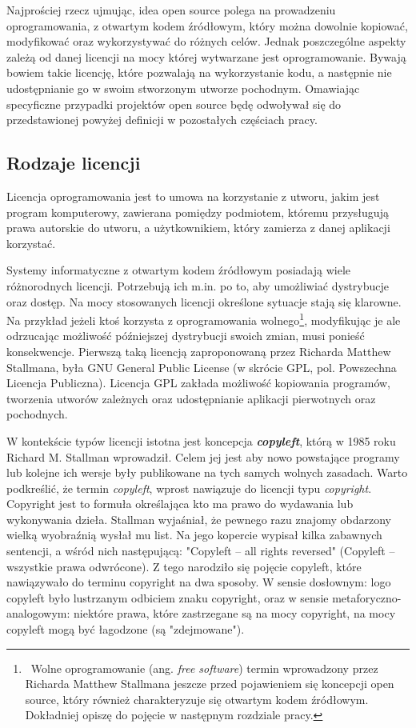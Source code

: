 \documentclass{article}
\begin{document}
Najprościej rzecz ujmując, idea open source polega na prowadzeniu oprogramowania, z otwartym kodem źródłowym, który można dowolnie kopiować, modyfikować oraz wykorzystywać do różnych celów. Jednak poszczególne aspekty zależą od danej licencji na mocy której wytwarzane jest oprogramowanie. Bywają bowiem takie licencję, które pozwalają na wykorzystanie kodu, a następnie nie udostępnianie go w swoim stworzonym utworze pochodnym. Omawiając specyficzne przypadki projektów open source będę odwoływał się do przedstawionej powyżej definicji w pozostałych częściach pracy.

\subsection{Rodzaje licencji}

\hspace{4mm} Licencja oprogramowania jest to umowa na korzystanie z utworu, jakim jest program komputerowy, zawierana pomiędzy podmiotem, któremu przysługują prawa autorskie do utworu, a użytkownikiem, który zamierza z danej aplikacji korzystać\cite{wikipedia1}.

Systemy informatyczne z otwartym kodem źródłowym posiadają wiele różnorodnych licencji. Potrzebują ich m.in. po to, aby umożliwiać dystrybucje oraz dostęp. Na mocy stosowanych licencji określone sytuacje stają się klarowne. Na przykład jeżeli ktoś korzysta z oprogramowania wolnego\footnote{\, Wolne oprogramowanie (ang. \emph{free software}) termin wprowadzony przez Richarda Matthew Stallmana jeszcze przed pojawieniem się koncepcji open source, który również charakteryzuje się otwartym kodem źródłowym. Dokładniej opiszę do pojęcie w następnym rozdziale pracy.}, modyfikując je ale odrzucając możliwość późniejszej dystrybucji swoich zmian, musi ponieść konsekwencje. Pierwszą taką licencją zaproponowaną przez Richarda Matthew Stallmana, była GNU General Public License (w skrócie GPL, pol. Powszechna Licencja Publiczna)\cite{Kotula}. Licencja GPL zakłada możliwość kopiowania programów, tworzenia utworów zależnych oraz udostępnianie aplikacji pierwotnych oraz pochodnych\cite{wikipedia2}.

W kontekście typów licencji istotna jest koncepcja \textbf{\emph{copyleft}}, którą w 1985 roku Richard M. Stallman wprowadził. Celem jej jest aby nowo powstające programy lub kolejne ich wersje były publikowane na tych samych wolnych zasadach. Warto podkreślić, że termin \emph{copyleft}, wprost nawiązuje do licencji typu \emph{copyright}. Copyright jest to formuła określająca kto ma prawo do wydawania lub wykonywania dzieła\cite{sjp}. Stallman wyjaśniał, że pewnego razu znajomy obdarzony wielką wyobraźnią wysłał mu list. Na jego kopercie wypisał kilka zabawnych sentencji, a wśród nich następującą: "Copyleft  – all rights reversed" (Copyleft  – wszystkie prawa odwrócone). Z tego narodziło się pojęcie copyleft, które nawiązywało do terminu copyright na dwa sposoby. W sensie dosłownym: logo copyleft było lustrzanym odbiciem znaku copyright, oraz w sensie metaforyczno-analogowym: niektóre prawa, które zastrzegane są na mocy copyright, na mocy copyleft mogą być łagodzone (są "zdejmowane")\cite{Kotula}.
\end{document}
